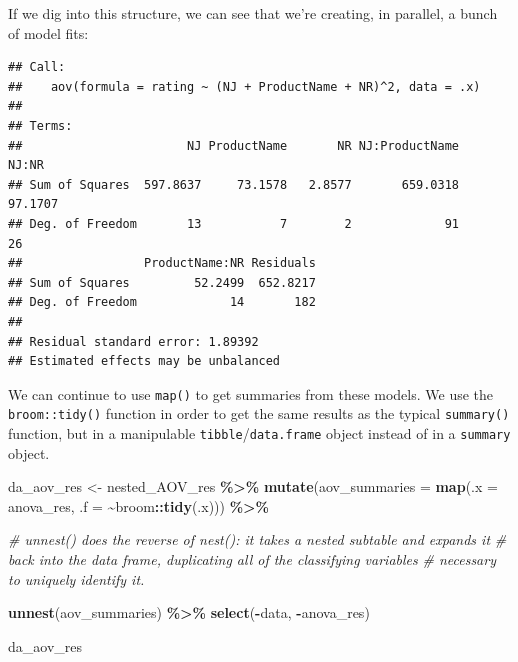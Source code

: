 \documentclass[
]{book}
\newenvironment{Shaded}{\begin{snugshade}}{\end{snugshade}}
\newcommand{\AttributeTok}[1]{\textcolor[rgb]{0.13,0.29,0.53}{#1}}
\newcommand{\CommentTok}[1]{\textcolor[rgb]{0.56,0.35,0.01}{\textit{#1}}}
\newcommand{\DecValTok}[1]{\textcolor[rgb]{0.00,0.00,0.81}{#1}}
\newcommand{\FunctionTok}[1]{\textcolor[rgb]{0.13,0.29,0.53}{\textbf{#1}}}
\newcommand{\NormalTok}[1]{#1}
\newcommand{\OtherTok}[1]{\textcolor[rgb]{0.56,0.35,0.01}{#1}}
\newcommand{\SpecialCharTok}[1]{\textcolor[rgb]{0.81,0.36,0.00}{\textbf{#1}}}
\begin{document}
If we dig into this structure, we can see that we're creating, in parallel, a bunch of model fits:

\begin{Shaded}
\end{Shaded}

\begin{verbatim}
## Call:
##    aov(formula = rating ~ (NJ + ProductName + NR)^2, data = .x)
## 
## Terms:
##                       NJ ProductName       NR NJ:ProductName    NJ:NR
## Sum of Squares  597.8637     73.1578   2.8577       659.0318  97.1707
## Deg. of Freedom       13           7        2             91       26
##                 ProductName:NR Residuals
## Sum of Squares         52.2499  652.8217
## Deg. of Freedom             14       182
## 
## Residual standard error: 1.89392
## Estimated effects may be unbalanced
\end{verbatim}

We can continue to use \texttt{map()} to get summaries from these models. We use the \texttt{broom::tidy()} function in order to get the same results as the typical \texttt{summary()} function, but in a manipulable \texttt{tibble}/\texttt{data.frame} object instead of in a \texttt{summary} object.

\begin{Shaded}
\begin{Highlighting}[]
\NormalTok{da\_aov\_res }\OtherTok{\textless{}{-}}
\NormalTok{  nested\_AOV\_res }\SpecialCharTok{\%\textgreater{}\%}
  \FunctionTok{mutate}\NormalTok{(}\AttributeTok{aov\_summaries =} \FunctionTok{map}\NormalTok{(}\AttributeTok{.x =}\NormalTok{ anova\_res, }
                             \AttributeTok{.f =} \SpecialCharTok{\textasciitilde{}}\NormalTok{broom}\SpecialCharTok{::}\FunctionTok{tidy}\NormalTok{(.x))) }\SpecialCharTok{\%\textgreater{}\%}
  
  \CommentTok{\# unnest() does the reverse of nest(): it takes a nested subtable and expands it}
  \CommentTok{\# back into the data frame, duplicating all of the classifying variables}
  \CommentTok{\# necessary to uniquely identify it.}
  
  \FunctionTok{unnest}\NormalTok{(aov\_summaries) }\SpecialCharTok{\%\textgreater{}\%}
  \FunctionTok{select}\NormalTok{(}\SpecialCharTok{{-}}\NormalTok{data, }\SpecialCharTok{{-}}\NormalTok{anova\_res)}

\NormalTok{da\_aov\_res}
\end{Highlighting}
\end{Shaded}
\end{document}
